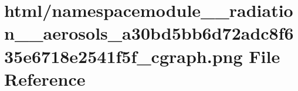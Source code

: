 \hypertarget{namespacemodule____radiation____aerosols__a30bd5bb6d72adc8f635e6718e2541f5f__cgraph_8png}{}\section{html/namespacemodule\+\_\+\+\_\+radiation\+\_\+\+\_\+aerosols\+\_\+a30bd5bb6d72adc8f635e6718e2541f5f\+\_\+cgraph.png File Reference}
\label{namespacemodule____radiation____aerosols__a30bd5bb6d72adc8f635e6718e2541f5f__cgraph_8png}
